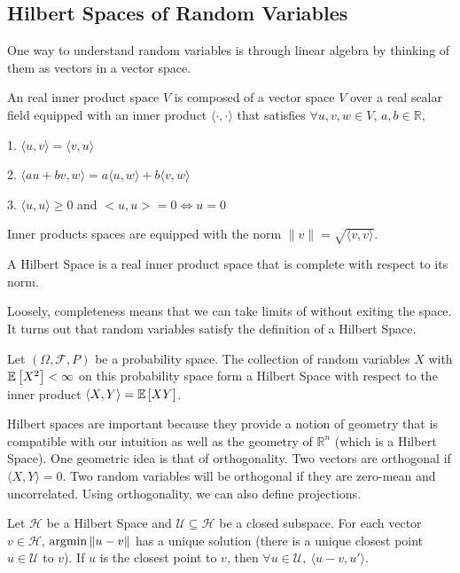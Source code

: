 \subsection{Hilbert Spaces of Random Variables}
One way to understand random variables is through linear algebra by thinking of them as vectors in a vector space.
\begin{definition}
	An real inner product space $V$ is composed of a vector space $V$ over a real scalar field equipped with an inner product $\langle \cdot,\cdot \rangle$ that satisfies $\forall u,v,w\in V$, $a, b\in\mathbb{R}$,

	1. $\langle u, v \rangle = \langle v, u \rangle$

	2. $\langle au + bv, w \rangle = a \langle u,w \rangle + b \langle v,w \rangle$

	3. $\langle u,u \rangle \geq 0$ and $<u,u> = 0 \Leftrightarrow u = 0$
	\label{defn:inner-product-space}
\end{definition}
Inner products spaces are equipped with the norm $\|v\| = \sqrt{\langle v, v \rangle }$.
\begin{definition}
	A Hilbert Space is a real inner product space that is complete with respect to its norm.
	\label{defn:hilbert-space}
\end{definition}
Loosely, completeness means that we can take limits of without exiting the space.
It turns out that random variables satisfy the definition of a Hilbert Space.
\begin{theorem}
	Let $(\Omega, \mathcal{F}, P)$ be a probability space. The collection of random variables $X$ with $\mathbb{E}\left[X^2\right] < \infty$ on this probability space form a Hilbert Space with respect to the inner product $\langle X, Y \rangle = \mathbb{E}\left[XY\right]$.
	\label{thm:rv-hilbert-space}
\end{theorem}
Hilbert spaces are important because they provide a notion of geometry that is compatible with our intuition as well as the geometry of $\mathbb{R}^n$ (which is a Hilbert Space).
One geometric idea is that of orthogonality.
Two vectors are orthogonal if $\langle X, Y\rangle = 0$.
Two random variables will be orthogonal if they are zero-mean and uncorrelated.
Using orthogonality, we can also define projections.
\begin{theorem}
	Let $\mathcal{H}$ be a Hilbert Space and $\mathcal{U} \subseteq \mathcal{H}$ be a closed subspace. For each vector $v\in\mathcal{H}$, $\operatorname*{argmin} \|u-v\|$ has a unique solution (there is a unique closest point $u\in\mathcal{U}$ to $v$).
	If $u$ is the closest point to $v$, then $\forall u\in\mathcal{U},\ \langle u-v, u'\rangle$.
	\label{thm:hilbert-projection}
\end{theorem}
